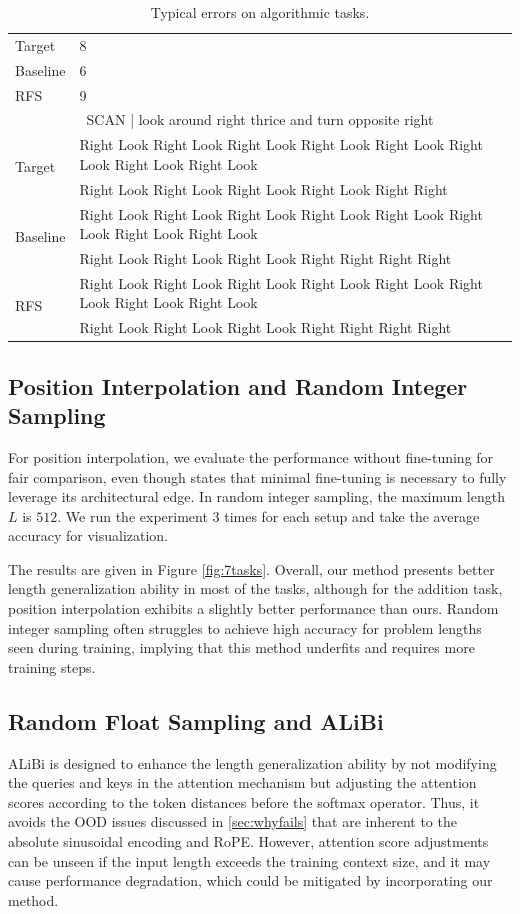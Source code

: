 \documentclass[11pt]{article}
\begin{document}
\begin{table}
{\begin{tabular}{ll}
    \midrule
    Target & 8 \\
    Baseline & 6 \\
    RFS & 9  \\
    \midrule\midrule
    \multicolumn{2}{c}{SCAN | look around right thrice and turn opposite right} \\
    \midrule
    \multirow{2}{*}{Target} & Right Look Right Look Right Look Right Look Right Look Right Look Right Look Right Look \\ & Right Look Right Look Right Look Right Look Right Right \\
    \multirow{2}{*}{Baseline} & Right Look Right Look Right Look Right Look Right Look Right Look Right Look Right Look \\ & Right Look Right Look Right Look Right Right Right Right \\
    \multirow{2}{*}{RFS} & Right Look Right Look Right Look Right Look Right Look Right Look Right Look Right Look \\ & Right Look Right Look Right Look Right Right Right Right \\
    \bottomrule
  \end{tabular}
  }
  \caption{Typical errors on algorithmic tasks.}
  \label{tab:error}
\end{table}

\subsection{Position Interpolation and Random Integer Sampling}\label{subsec:pi_ris}
For position interpolation, we evaluate the performance without fine-tuning for fair comparison, even though \citet{chen2023extendingcontextwindowlarge} states that minimal fine-tuning is necessary to fully leverage its architectural edge. In random integer sampling, the maximum length $L$ is $512$. We run the experiment 3 times for each setup and take the average accuracy for visualization.

The results are given in Figure \ref{fig:7tasks}. Overall, our method presents better length generalization ability in most of the tasks, although for the addition task, position interpolation exhibits a slightly better performance than ours. Random integer sampling often struggles to achieve high accuracy for problem lengths seen during training, implying that this method underfits and requires more training steps.

\subsection{Random Float Sampling and ALiBi}\label{subsec:alibi}
ALiBi is designed to enhance the length generalization ability by not modifying the queries and keys in the attention mechanism but adjusting the attention scores according to the token distances before the softmax operator. Thus, it avoids the OOD issues discussed in \ref{sec:whyfails} that are inherent to the absolute sinusoidal encoding and RoPE. However, attention score adjustments can be unseen if the input length exceeds the training context size, and it may cause performance degradation, which could be mitigated by incorporating our method.
\end{document}
